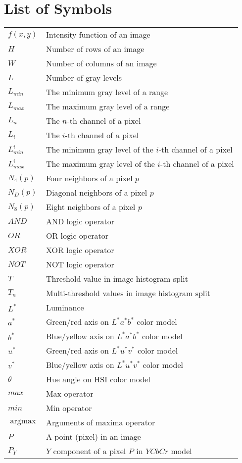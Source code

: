 \documentclass[12pt,twoside,a4paper]{book}
\theoremstyle{plain}
\theoremstyle{definition}
\DeclareMathOperator*{\argmax}{argmax}
\begin{document}
\chapter{List of Symbols}
\begin{tabular}{ll}
    $f(x, y)$   & Intensity function of an image \\
    $H$         & Number of rows of an image \\
    $W$         & Number of columns of an image \\
    $L$         & Number of gray levels \\
    $L_{min}$   & The minimum gray level of a range \\
    $L_{max}$   & The maximum gray level of a range \\
    $L_n$       & The $n$-th channel of a pixel \\
    $L_i$       & The $i$-th channel of a pixel \\
    $L^i_{min}$ & The minimum gray level of the $i$-th channel of a pixel \\
    $L^i_{max}$ & The maximum gray level of the $i$-th channel of a pixel \\
    $N_4(p)$    & Four neighbors of a pixel $p$ \\
    $N_D(p)$    & Diagonal neighbors of a pixel $p$ \\
    $N_8(p)$    & Eight neighbors of a pixel $p$ \\
    $AND$       & AND logic operator \\
    $OR$        & OR logic operator \\
    $XOR$       & XOR logic operator \\
    $NOT$       & NOT logic operator \\
    $T$         & Threshold value in image histogram split \\
    $T_n$       & Multi-threshold values in image histogram split \\
    $L^*$       & Luminance \\
    $a^*$       & Green/red axis on $L^*a^*b^*$ color model \\
    $b^*$       & Blue/yellow axis on $L^*a^*b^*$ color model \\
    $u^*$       & Green/red axis on $L^*u^*v^*$ color model \\
    $v^*$       & Blue/yellow axis on $L^*u^*v^*$ color model \\
    $\theta$    & Hue angle on HSI color model \\
    $max$       & Max operator \\
    $min$       & Min operator \\
    $\argmax$   & Arguments of maxima operator \\
    $P$         & A point (pixel) in an image \\
    $P_Y$       & $Y$ component of a pixel $P$ in $YCbCr$ model \\
\end{tabular}
\end{document}
